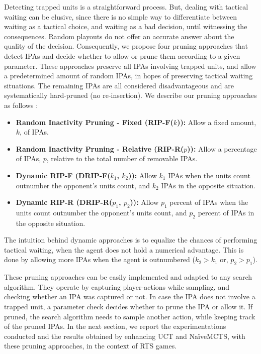 \documentclass[conference]{IEEEtran}
\begin{document}
Detecting trapped units is a straightforward process. But, dealing with tactical waiting can be elusive, since there is no simple way to differentiate between waiting as a tactical choice, and waiting as a bad decision, until witnessing the consequences. Random playouts do not offer an accurate answer about the quality of the decision. Consequently, we propose four pruning approaches that detect IPAs and decide whether to allow or prune them according to a given parameter. These approaches preserve all IPAs involving trapped units, and allow a predetermined amount of random IPAs, in hopes of preserving tactical waiting situations. The remaining IPAs are all considered disadvantageous and are systematically hard-pruned (no re-insertion). We describe our pruning approaches as follows :

\begin{itemize}
\item \textbf{Random Inactivity Pruning - Fixed (RIP-F($k$)):} Allow a fixed amount, $k$, of IPAs.
\item \textbf{Random Inactivity Pruning - Relative (RIP-R($p$)):} Allow a percentage of IPAs, $p$, relative to the total number of removable IPAs.
\item \textbf{Dynamic RIP-F (DRIP-F($k_1$, $k_2$)):} Allow $k_1$ IPAs when the units count outnumber the opponent's units count, and $k_2$ IPAs in the opposite situation.
\item \textbf{Dynamic RIP-R (DRIP-R($p_1$, $p_2$)):} Allow $p_1$ percent of IPAs when the units count outnumber the opponent's units count, and $p_2$ percent of IPAs in the opposite situation.
\end{itemize}

The intuition behind dynamic approaches is to equalize the chances of performing tactical waiting, when the agent does not hold a numerical advantage. This is done by allowing more IPAs when the agent is outnumbered ($k_2 > k_1$ or, $p_2 > p_1$).

These pruning approaches can be easily implemented and adapted to any search algorithm. They operate by capturing player-actions while sampling, and checking whether an IPA was captured or not. In case the IPA does not involve a trapped unit, a parameter check decides whether to prune the IPA or allow it. If pruned, the search algorithm needs to sample another action, while keeping track of the pruned IPAs. In the next section, we report the experimentations conducted and the results obtained by enhancing UCT and NaïveMCTS, with these pruning approaches, in the context of RTS games.
\end{document}
